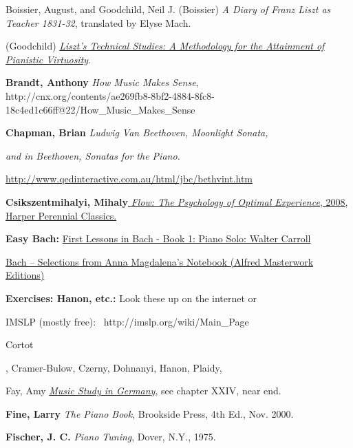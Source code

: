 \documentclass[11pt,a4paper]{book}
\begin{document}
Boissier, August\label{r:Boissier}, and Goodchild, Neil
J. (Boissier) \emph{A Diary of Franz Liszt as Teacher 1831-32},
translated by Elyse Mach.

(Goodchild)
\href{http://www.appca.com.au/proceedings/2007/papers_part_1/goodchild_liszt_methodology.pdf}{\emph{Liszt's
Technical Studies: A Methodology for the Attainment of Pianistic
Virtuosity}}.

{\textbf{Brandt, Anthony}} \emph{How Music Makes
Sense},\\
http://cnx.org/contents/ae269fb8-8bf2-4884-8fc8-18c4ed1c66ff@22/How\_Music\_Makes\_Sense

\textbf{Chapman, Brian}{ \emph{Ludwig Van
Beethoven, Moonlight Sonata,}}

\emph{and in Beethoven, Sonatas for the Piano.}

\href{http://www.qedinteractive.com.au/html/jbc/bethvint.htm}{http://www.qedinteractive.com.au/html/jbc/bethvint.htm}

{\textbf{Csikszentmihalyi,
Mihaly}\href{http://www.amazon.com/Flow-The-Psychology-Optimal-Experience/dp/0061339202}{{
\emph{Flow: The Psychology of Optimal Experience}, 2008, Harper
Perennial Classics.}}}

\textbf{\hypertarget{r:easy-bach}{Easy Bach:}} \href{http://www.amazon.com/First-Lessons-Bach-Book-Piano/dp/0793525551/ref=sr_1_1?ie=UTF8\&qid=1412089888\&sr=8-1\&keywords=bach\%2C+first+lessons\%2C+carroll}{
First Lessons in Bach - Book 1: Piano Solo: Walter Carroll}

\href{http://www.amazon.com/Selections-Magdalenas-Notebook-Masterwork-Editions/dp/0882842625/ref=sr_1_3?ie=UTF8\&qid=1412089655\&sr=8-3\&keywords=anna+magdalena+bach+music+book}{Bach
-- Selections from Anna Magdalena's Notebook (Alfred Masterwork
Editions)}

\textbf{Exercises: Hanon, etc.:}{ Look these up
on the internet or{~}}

IMSLP (mostly free):{~ }http://imslp.org/wiki/Main\_Page

\hypertarget{r:cortot}{Cortot}, Cramer-Bulow, Czerny, Dohnanyi, Hanon, Plaidy,

Fay\label{r:Fay}, Amy \href{http://www.gutenberg.org/files/37322/37322-h/37322-h.htm\#CHAPTER_XX}{
\emph{Music Study in Germany}}, see chapter XXIV, near end.

{\textbf{Fine, Larry}} \emph{The Piano Book},
Brookside Press, 4th Ed., Nov. 2000.

\textbf{Fischer, J. C.}{ \emph{Piano Tuning},
Dover, N.Y., 1975.}
\end{document}

